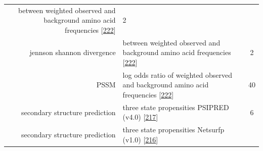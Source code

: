 \documentclass[11pt,a4paper,twoside]{book}
\theoremstyle{definition}
\theoremstyle{definition}
\theoremstyle{remark}
\begin{document}
\begin{longtable}[]{@{}rlc@{}}
\begin{minipage}[t]{0.50\columnwidth}
between weighted observed and background amino acid frequencies
{[}\protect\hyperlink{ref-Robinson1991}{222}{]}\strut
\end{minipage} & \begin{minipage}[t]{0.18\columnwidth}\centering\strut
2\strut
\end{minipage}\tabularnewline
\begin{minipage}[t]{0.23\columnwidth}\raggedleft\strut
jennson shannon divergence\strut
\end{minipage} & \begin{minipage}[t]{0.50\columnwidth}\raggedright\strut
between weighted observed and background amino acid frequencies
{[}\protect\hyperlink{ref-Robinson1991}{222}{]}\strut
\end{minipage} & \begin{minipage}[t]{0.18\columnwidth}\centering\strut
2\strut
\end{minipage}\tabularnewline
\begin{minipage}[t]{0.23\columnwidth}\raggedleft\strut
PSSM\strut
\end{minipage} & \begin{minipage}[t]{0.50\columnwidth}\raggedright\strut
log odds ratio of weighted observed and background amino acid
frequencies {[}\protect\hyperlink{ref-Robinson1991}{222}{]}\strut
\end{minipage} & \begin{minipage}[t]{0.18\columnwidth}\centering\strut
40\strut
\end{minipage}\tabularnewline
\begin{minipage}[t]{0.23\columnwidth}\raggedleft\strut
secondary structure prediction\strut
\end{minipage} & \begin{minipage}[t]{0.50\columnwidth}\raggedright\strut
three state propensities PSIPRED (v4.0)
{[}\protect\hyperlink{ref-Jones1999}{217}{]}\strut
\end{minipage} & \begin{minipage}[t]{0.18\columnwidth}\centering\strut
6\strut
\end{minipage}\tabularnewline
\begin{minipage}[t]{0.23\columnwidth}\raggedleft\strut
secondary structure prediction\strut
\end{minipage} & \begin{minipage}[t]{0.50\columnwidth}\raggedright\strut
three state propensities Netsurfp (v1.0)
{[}\protect\hyperlink{ref-Petersen2009a}{216}{]}\strut
\end{minipage} & \begin{minipage}[t]{0.18\columnwidth}\centering\strut

\end{minipage}
\end{longtable}
\end{document}
